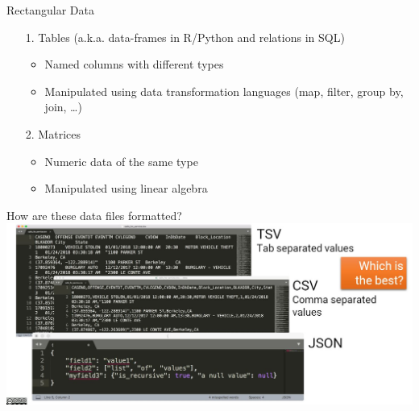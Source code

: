\documentclass[aspectratio=169]{../latex_main/tntbeamer}  %
\begin{document}
\begin{frame}{Rectangular Data}
	\begin{itemize}
		    \item[1.] Tables (a.k.a. data-frames  in R/Python and relations in SQL)
		    \begin{itemize}
		        \item Named columns with different types
		        \item Manipulated using data transformation languages (map, filter, group by, join, …)
		    \end{itemize}
		    \item[2.] Matrices
		    \begin{itemize}
		        \item Numeric data of the same type
		        \item Manipulated using linear algebra 
		    \end{itemize}
		\end{itemize}
	\end{frame}
	
	
	
	
	\begin{frame}{How are these data files formatted?}
	    \includegraphics[scale=.39]{Bild9}
	\end{frame}
\end{document}
